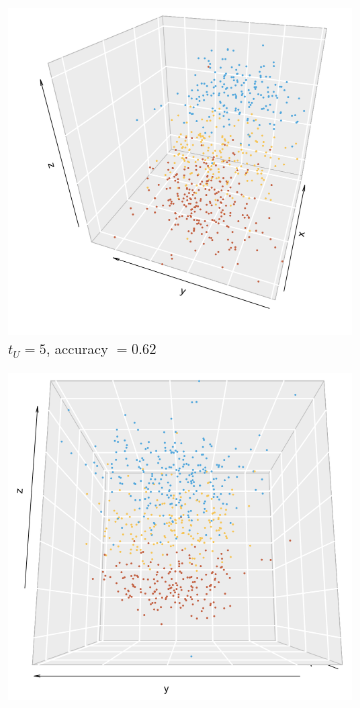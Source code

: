 \documentclass[10pt,journal,compsoc]{IEEEtran}
\numberwithin{equation}{section}
\begin{document}
\begin{figure}
\begin{subfigure}{.24\columnwidth}
\includegraphics[width=\columnwidth]{real_5_d}%
\caption{$t_U = 5$, accuracy $=0.62$}
\end{subfigure}
\begin{subfigure}{.24\columnwidth}
\includegraphics[width=\columnwidth]{real_6_d}%

\end{subfigure}
\end{figure}
\end{document}
